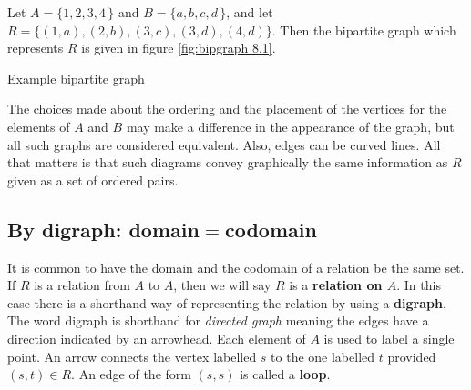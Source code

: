 \begin{exmp}\label{ex:bipgraph 8.1}
 Let $A=\{1,2,3,4\,\}$ and $B=\{a,b,c,d\,\}$, and let 
$R=\{(1,a), (2,b), (3,c), (3,d), (4,d)\}$.
Then the bipartite graph which represents $R$ is given in figure \ref{fig:bipgraph 8.1}.

\begin{marginfigure}

\caption{Example bipartite graph}\label{fig:bipgraph 8.1}
\end{marginfigure}
\end{exmp}


The choices made about the  ordering and the placement of the vertices for the elements of 
$A$ and $B$ may make a difference in 
the appearance of the graph, but all such graphs are considered equivalent. Also, edges can be 
curved lines. All that matters is that such diagrams  
convey graphically the same information as $R$ given as a set of ordered pairs.

\subsection{By digraph: domain$=$codomain}
It is common to have the domain and the codomain of a relation be the same set. If $R$ is a 
relation from $A$ to $A$, then we will say $R$ is a  {\bfseries relation on $A$}.
In this case there is a shorthand way of representing the relation by using 
a {\bfseries digraph}. The word digraph is shorthand for {\itshape directed graph} 
meaning the edges have a direction indicated by an arrowhead. Each element of $A$ is used to label a single point.
An arrow connects the vertex labelled $s$ to the one labelled $t$ provided
$(s,t)\in R$. An edge of the form $(s,s)$ is called a {\bfseries loop}.

